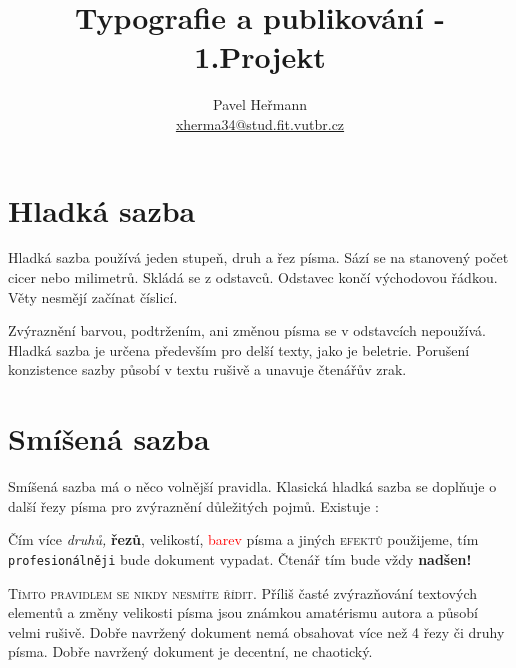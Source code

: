 \documentclass[a4paper, 10pt, twocolumn]{article}
\title{Typografie a publikování - 1.Projekt}
\author{Pavel Heřmann \\ \href{mailto:xherma34@stud.fit.vutbr.cz}{xherma34@stud.fit.vutbr.cz}}
\begin{document}
\maketitle
    \section{Hladká sazba}
    
        Hladká sazba používá jeden stupeň, druh a řez písma. Sází se na stanovený 
        počet cicer nebo milimetrů.
        Skládá se z odstavců. Odstavec končí východovou řádkou. Věty nesmějí 
        začínat číslicí. 
        
        Zvýraznění barvou, podtržením, ani změnou písma se v odstavcích nepoužívá. 
        Hladká sazba je určena především pro delší texty, jako 
        je beletrie. Porušení konzistence sazby působí v textu rušivě a unavuje čtenářův zrak.

    \section{Smíšená sazba}
    
        Smíšená sazba má o něco volnější pravidla. Klasická hladká sazba se doplňuje o 
        další řezy písma pro zvýraznění důležitých pojmů.
        Existuje :
        
    \begin{adjustwidth}{0.7cm}{0.7cm}
        \vspace{0.25cm}
                Čím více \textit{druhů,} \textbf{řezů}, {\scriptsize velikostí},
                \textcolor{red}{barev} písma a jiných \textsc{efektů}  použijeme, tím 
                {\tt profesionálněji} bude { \selectfont dokument} vypadat.
                \Huge{Č}\huge{t}\LARGE{e}\Large{n}\large{á}\normalsize{ř}
                \small{t}\footnotesize{í}\scriptsize{m} bude vždy \textbf{\huge nadšen!}
            
        \vspace{0.25cm}
    \end{adjustwidth}
    
    \par

    \textsc{Tímto pravidlem se nikdy nesmíte řídit.}
    Příliš časté zvýrazňování textových elementů a změny velikosti písma jsou známkou amatérismu autora a působí velmi rušivě.
    Dobře navržený dokument nemá obsahovat více než 4 řezy či druhy písma.
    Dobře navržený dokument je decentní, ne chaotický.
    
\end{document}
